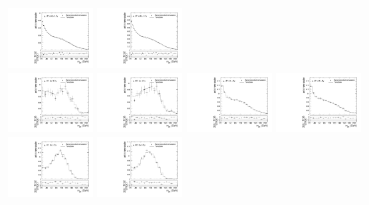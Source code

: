 \begin{figure}[htbp]
  \includegraphics[width=0.2\textwidth]{fig/2Dfit/templateVsReco_nonRes_r0_MJ_mu_LP_nobb_LDy.pdf}
  \includegraphics[width=0.2\textwidth]{fig/2Dfit/templateVsReco_nonRes_r0_MJ_e_LP_nobb_LDy.pdf}\\
  \includegraphics[width=0.2\textwidth]{fig/2Dfit/templateVsReco_nonRes_r0_MJ_mu_HP_vbf_LDy.pdf}
  \includegraphics[width=0.2\textwidth]{fig/2Dfit/templateVsReco_nonRes_r0_MJ_e_HP_vbf_LDy.pdf}
  \includegraphics[width=0.2\textwidth]{fig/2Dfit/templateVsReco_nonRes_r0_MJ_mu_LP_vbf_LDy.pdf}
  \includegraphics[width=0.2\textwidth]{fig/2Dfit/templateVsReco_nonRes_r0_MJ_e_LP_vbf_LDy.pdf}\\
  \includegraphics[width=0.2\textwidth]{fig/2Dfit/templateVsReco_nonRes_r0_MJ_mu_HP_bb_HDy.pdf}
  \includegraphics[width=0.2\textwidth]{fig/2Dfit/templateVsReco_nonRes_r0_MJ_e_HP_bb_HDy.pdf}

\end{figure}
